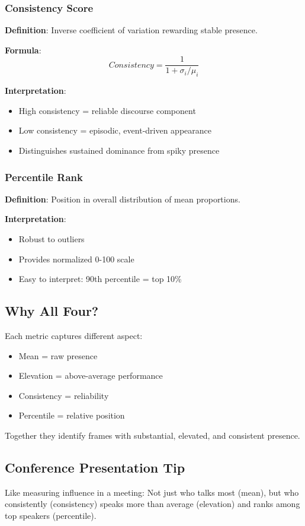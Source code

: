 \documentclass[11pt]{article}
\begin{document}
\subsubsection{Consistency Score}
\textbf{Definition}: Inverse coefficient of variation rewarding stable presence.

\textbf{Formula}:
$$Consistency = \frac{1}{1 + \sigma_i/\mu_i}$$

\textbf{Interpretation}:
\begin{itemize}
    \item High consistency = reliable discourse component
    \item Low consistency = episodic, event-driven appearance
    \item Distinguishes sustained dominance from spiky presence
\end{itemize}

\subsubsection{Percentile Rank}
\textbf{Definition}: Position in overall distribution of mean proportions.

\textbf{Interpretation}:
\begin{itemize}
    \item Robust to outliers
    \item Provides normalized 0-100 scale
    \item Easy to interpret: 90th percentile = top 10\%
\end{itemize}

\subsection{Why All Four?}
Each metric captures different aspect:
\begin{itemize}
    \item Mean = raw presence
    \item Elevation = above-average performance
    \item Consistency = reliability
    \item Percentile = relative position
\end{itemize}

Together they identify frames with substantial, elevated, and consistent presence.

\subsection{Conference Presentation Tip}
Like measuring influence in a meeting: Not just who talks most (mean), but who consistently (consistency) speaks more than average (elevation) and ranks among top speakers (percentile).
\end{document}
